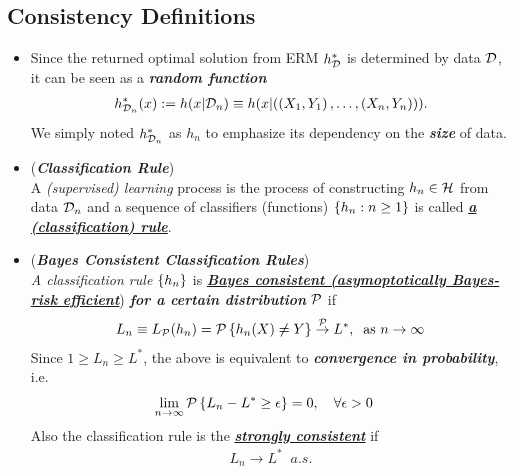 \documentclass[11pt]{article}
\begin{document}
\subsection{Consistency Definitions}
\begin{itemize}
\item \begin{remark}
Since the returned optimal solution from ERM $h_{{\mathcal D}}^{*}$ is determined by data ${\mathcal D}$, it can be seen as a \emph{\textbf{random function}}
\begin{align*}
h_{{\mathcal D}_n}^{*}(x) := h(x | {\mathcal D}_n) \equiv  h(x | ((X_1, Y_1) \,{,}\ldots{,}\, (X_n, Y_n)) ).
\end{align*}  We simply noted $h_{{\mathcal D}_n}^{*}$ as $h_n$ to emphasize its dependency on the \emph{\textbf{size}} of data.
\end{remark}

\item  \begin{definition} (\textbf{\emph{Classification Rule}}) \citep{devroye2013probabilistic} \\
A \emph{(supervised) learning} process is the process of constructing $h_n \in {\mathcal H}$ from data ${\mathcal D}_n$ and a sequence of classifiers (functions) $\left\{h_{n}: n\ge 1\right\}$ is called \underline{\emph{\textbf{a (classification) rule}}}.
\end{definition}

\item 
\begin{definition} (\emph{\textbf{Bayes Consistent Classification Rules}})\\
\emph{A classification rule} $\left\{h_n\right\}$ is \underline{\emph{\textbf{Bayes consistent (asymoptotically Bayes-risk efficient}}}) \emph{\textbf{for a certain distribution}} ${\mathcal P}$ if 
\begin{align*}
L_n \equiv  L_{{\mathcal P}}(h_n) =  {\mathcal P}\left\{ h_n(X)\neq Y\right\} \stackrel{{\mathcal P}}{\rightarrow} L^{*},\;\; \text{as } n\rightarrow \infty
\end{align*}
Since $1\ge L_{n} \ge  L^{*}$, the above is equivalent to \emph{\textbf{convergence in probability}}, i.e.
\begin{align*}
\lim\limits_{n\rightarrow \infty}{\mathcal P}\left\{ L_{n} - L^{*}\ge \epsilon \right\}&= 0, \quad \forall \epsilon >0
\end{align*}
Also the classification rule is the \underline{\emph{\textbf{strongly consistent}}} if 
\begin{align*}
L_{n} \rightarrow L^{*} \;\; a.s.
\end{align*}
\end{definition}


\end{itemize}
\end{document}
